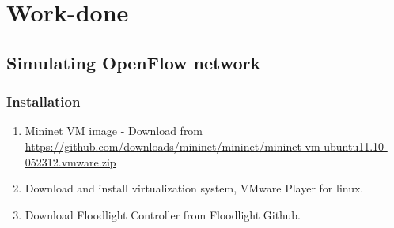 \documentclass[12pt,a4paper]{article}
\begin{document}
\section{Work-done}

\subsection{Simulating OpenFlow network}
\subsubsection{Installation}
\begin{enumerate}
\item Mininet VM image - Download from  \url{https://github.com/downloads/mininet/mininet/mininet-vm-ubuntu11.10-052312.vmware.zip}

\item Download and install virtualization system, VMware Player for linux. 

\item Download Floodlight Controller from Floodlight Github.


\end{enumerate}
\end{document}
